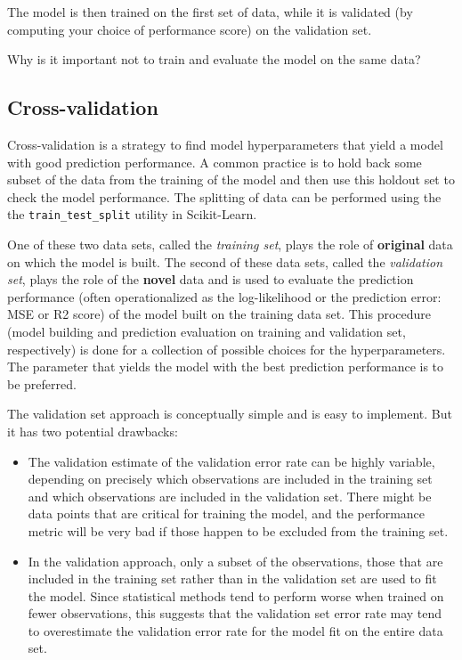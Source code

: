 \documentclass[%
oneside,                 %
final,                   %
10pt]{article}
\newenvironment{question_mdfboxadmon}[1][]{
\begin{question_mdfboxmdframed}[frametitle=#1]
}
{
\end{question_mdfboxmdframed}
}
\begin{document}
The model is then trained on the first set of data, while it is validated (by computing your choice of performance score) on the validation set.


\begin{question_mdfboxadmon}[Question]
Why is it important not to train and evaluate the model on the same data?
\end{question_mdfboxadmon} %




\subsection{Cross-validation}

Cross-validation is a strategy to find model hyperparameters that yield a model with good prediction
performance. A common practice is to hold back some subset of the data from the training of the model and then use this holdout set to check the model performance. The splitting of data can be performed using the the \Verb!train_test_split! utility in Scikit-Learn.

One of these two data sets, called the 
\emph{training set}, plays the role of \textbf{original} data on which the model is
built. The second of these data sets, called the \emph{validation set}, plays the
role of the \textbf{novel} data and is used to evaluate the prediction
performance (often operationalized as the log-likelihood or the
prediction error: MSE or R2 score) of the model built on the training data set. This
procedure (model building and prediction evaluation on training and
validation set, respectively) is done for a collection of possible choices for the hyperparameters. The parameter that yields the model with
the best prediction performance is to be preferred. 

The validation set approach is conceptually simple and is easy to implement. But it has two potential drawbacks:

\begin{itemize}
\item The validation estimate of the validation error rate can be highly variable, depending on precisely which observations are included in the training set and which observations are included in the validation set. There might be data points that are critical for training the model, and the performance metric will be very bad if those happen to be excluded from the training set.

\item In the validation approach, only a subset of the observations, those that are included in the training set rather than in the validation set are used to fit the model. Since statistical methods tend to perform worse when trained on fewer observations, this suggests that the validation set error rate may tend to overestimate the validation error rate for the model fit on the entire data set.
\end{itemize}
\end{document}
